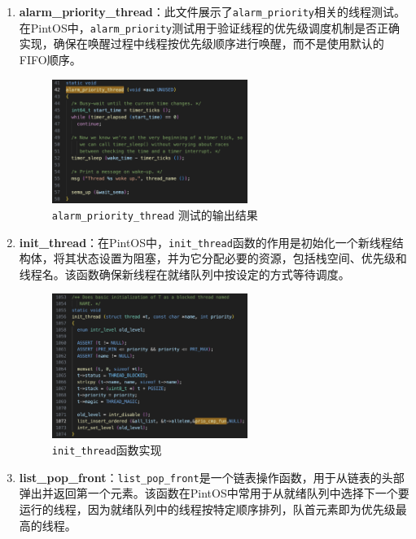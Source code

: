 \documentclass{article}
\begin{document}
\begin{enumerate}
	\item \textbf{alarm\_priority\_thread}：此文件展示了\texttt{alarm\_priority}相关的线程测试。在PintOS中，\texttt{alarm\_priority}测试用于验证线程的优先级调度机制是否正确实现，确保在唤醒过程中线程按优先级顺序进行唤醒，而不是使用默认的FIFO顺序。
	
	\begin{figure}[H]
		\centering
		\includegraphics[width=0.6\textwidth]{img/alarm_priority_thread.png}
		\caption{\texttt{alarm\_priority\_thread} 测试的输出结果}
	\end{figure}
	
	\item \textbf{init\_thread}：在PintOS中，\texttt{init\_thread}函数的作用是初始化一个新线程结构体，将其状态设置为阻塞，并为它分配必要的资源，包括栈空间、优先级和线程名。该函数确保新线程在就绪队列中按设定的方式等待调度。
	
	\begin{figure}[H]
		\centering
		\includegraphics[width=0.6\textwidth]{img/init_thread.png}
		\caption{\texttt{init\_thread}函数实现}
	\end{figure}
	
	\item \textbf{list\_pop\_front}：\texttt{list\_pop\_front}是一个链表操作函数，用于从链表的头部弹出并返回第一个元素。该函数在PintOS中常用于从就绪队列中选择下一个要运行的线程，因为就绪队列中的线程按特定顺序排列，队首元素即为优先级最高的线程。
	

\end{enumerate}
\end{document}
